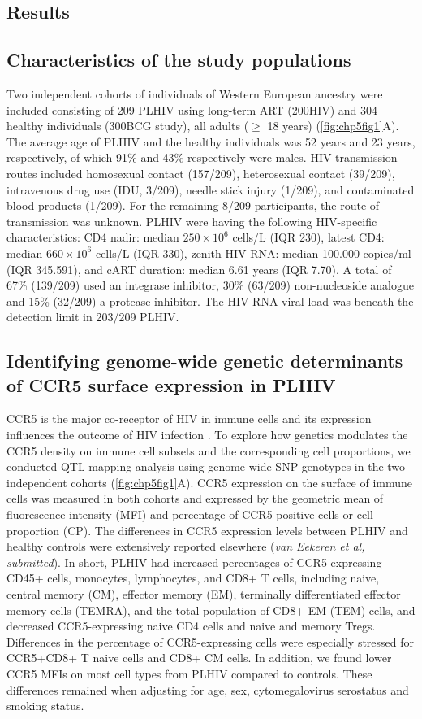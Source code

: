 \documentclass{book}
\begin{document}
\begin{refsection}
\section*{Results}
\subsection*{Characteristics of the study populations}
Two independent cohorts of individuals of Western European ancestry were included consisting of 209 PLHIV using long-term ART (200HIV) and 304 healthy individuals (300BCG study), all adults ($\geq$ 18 years) (\ref{fig:chp5fig1}A).
The average age of PLHIV and the healthy individuals was 52 years and 23 years, respectively, of which 91\% and 43\% respectively were males.
HIV transmission routes included homosexual contact (157/209), heterosexual contact (39/209), intravenous drug use (IDU, 3/209), needle stick injury (1/209), and contaminated blood products (1/209).
For the remaining 8/209 participants, the route of transmission was unknown.
PLHIV were having the following HIV-specific characteristics: CD4 nadir: median $250 \times 10^6$ cells/L (IQR 230), latest CD4: median $660 \times 10^6$ cells/L (IQR 330), zenith HIV-RNA: median 100.000 copies/ml (IQR 345.591), and cART duration: median 6.61 years (IQR 7.70).
A total of 67\% (139/209) used an integrase inhibitor, 30\% (63/209) non-nucleoside analogue and 15\% (32/209) a protease inhibitor.
The HIV-RNA viral load was beneath the detection limit in 203/209 PLHIV.

\subsection*{Identifying genome-wide genetic determinants of CCR5 surface expression in PLHIV}
CCR5 is the major co-receptor of HIV in immune cells and its expression influences the outcome of HIV infection \cite{Brelot2018CCR5}.
To explore how genetics modulates the CCR5 density on immune cell subsets and the corresponding cell proportions, we conducted QTL mapping analysis using genome-wide SNP genotypes in the two independent cohorts (\ref{fig:chp5fig1}A).
CCR5 expression on the surface of immune cells was measured in both cohorts and expressed by the geometric mean of fluorescence intensity (MFI) and percentage of CCR5 positive cells or cell proportion (CP).
The differences in CCR5 expression levels between PLHIV and healthy controls were extensively reported elsewhere (\textit{van Eekeren et al, submitted}).
In short, PLHIV had increased percentages of CCR5-expressing CD45+ cells, monocytes, lymphocytes, and CD8+ T cells, including naive, central memory (CM), effector memory (EM), terminally differentiated effector memory cells (TEMRA), and the total population of CD8+ EM (TEM) cells, and decreased CCR5-expressing naive CD4 cells and naive and memory Tregs.
Differences in the percentage of CCR5-expressing cells were especially stressed for CCR5+CD8+ T naive cells and CD8+ CM cells.
In addition, we found lower CCR5 MFIs on most cell types from PLHIV compared to controls.
These differences remained when adjusting for age, sex, cytomegalovirus serostatus and smoking status.


\end{refsection}
\end{document}
